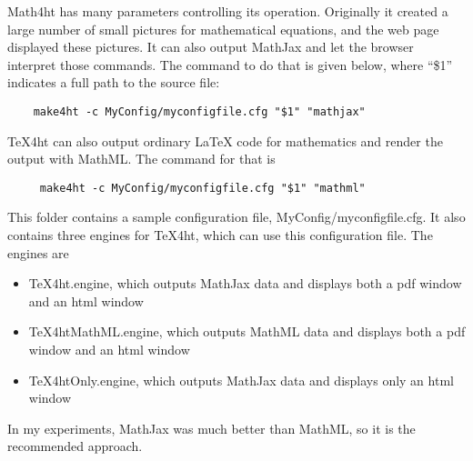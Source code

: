 \documentclass[11pt, oneside]{article}   	%
\begin{document}
Math4ht has many parameters controlling its operation. Originally it created a large
number of small pictures for mathematical equations, and the web page displayed these
pictures. It can also output MathJax and let the browser interpret those commands. The
command to do that is given below, where “\$1” indicates a full path to the source file:
\begin{verbatim}
    make4ht -c MyConfig/myconfigfile.cfg "$1" "mathjax"
\end{verbatim}
TeX4ht can also output ordinary LaTeX code for mathematics and render the output
with MathML. The command for that is
\begin{verbatim}
     make4ht -c MyConfig/myconfigfile.cfg "$1" "mathml"
\end{verbatim}

This folder contains a sample configuration file, MyConfig/myconfigfile.cfg. It also
contains three engines for TeX4ht, which can use this configuration file.
The engines are
\begin{itemize}
\item TeX4ht.engine, which outputs MathJax data and displays both a pdf window and an html window
\item TeX4htMathML.engine, which outputs MathML data and displays both a pdf window and an html window
\item TeX4htOnly.engine, which outputs MathJax data and displays only an html window
\end{itemize}

In my experiments, MathJax was much better than MathML, so it is the recommended approach.
\end{document}

